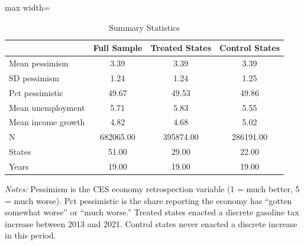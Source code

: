\begin{table}[htbp]
\centering
\caption{Summary Statistics}
\label{tab:summary}
\begin{adjustbox}{max width=\textwidth}
\begin{tabular}{lccc}
\toprule
& Full Sample & Treated States & Control States \\
\midrule
Mean pessimism & 3.39 & 3.39 & 3.39 \\
SD pessimism & 1.24 & 1.24 & 1.25 \\
Pct pessimistic & 49.67 & 49.53 & 49.86 \\
Mean unemployment & 5.71 & 5.83 & 5.55 \\
Mean income growth & 4.82 & 4.68 & 5.02 \\
N & 682065.00 & 395874.00 & 286191.00 \\
States & 51.00 & 29.00 & 22.00 \\
Years & 19.00 & 19.00 & 19.00 \\
\bottomrule
\end{tabular}
\end{adjustbox}
\begin{tablenotes}[flushleft]
\small
\item \textit{Notes:} Pessimism is the CES economy retrospection variable (1 = much better, 5 = much worse). Pct pessimistic is the share reporting the economy has ``gotten somewhat worse'' or ``much worse.'' Treated states enacted a discrete gasoline tax increase between 2013 and 2021. Control states never enacted a discrete increase in this period.
\end{tablenotes}
\end{table}

